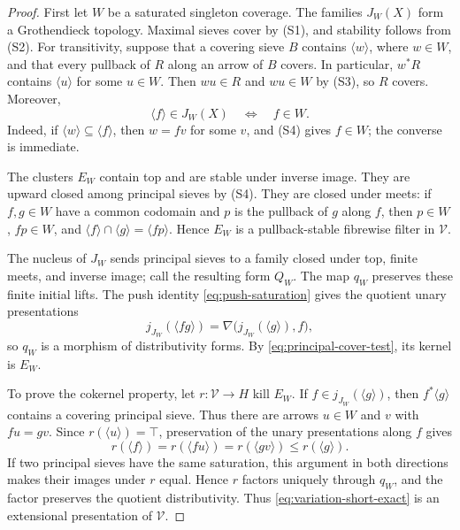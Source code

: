 \documentclass[12pt,oneside,reqno]{amsart}
\theoremstyle{definition}
\theoremstyle{remark}
\newcommand{\Var}{\mathscr V}
\newcommand{\prin}[1]{\langle #1\rangle}
\begin{document}
\begin{proof}
First let \(W\) be a saturated singleton coverage.  The families
\(J_W(X)\) form a Grothendieck topology.  Maximal sieves cover by (S1),
and stability follows from (S2).  For transitivity, suppose that a
covering sieve \(B\) contains \(\prin w\), where \(w\in W\), and that
every pullback of \(R\) along an arrow of \(B\) covers.  In particular,
\(w^*R\) contains \(\prin u\) for some \(u\in W\).  Then \(wu\in R\)
and \(wu\in W\) by (S3), so \(R\) covers.  Moreover,
\begin{equation}\label{eq:principal-cover-test}
                  \prin f\in J_W(X)\quad\Longleftrightarrow\quad f\in W.
\end{equation}
Indeed, if \(\prin w\subseteq\prin f\), then \(w=fv\) for some \(v\),
and (S4) gives \(f\in W\); the converse is immediate.

The clusters \(E_W\) contain top and are stable under inverse image.
They are upward closed among principal sieves by (S4).  They are closed
under meets: if \(f,g\in W\) have a common codomain and \(p\) is the
pullback of \(g\) along \(f\), then \(p\in W\), \(fp\in W\), and
\(\prin f\cap\prin g=\prin{fp}\).  Hence \(E_W\) is a
pullback-stable fibrewise filter in \(\Var\).

The nucleus of \(J_W\) sends principal sieves to a family closed under
top, finite meets, and inverse image; call the resulting form \(Q_W\).
The map \(q_W\) preserves these finite initial lifts.  The push identity
\eqref{eq:push-saturation} gives the quotient unary presentations
\[
 j_{J_W}(\prin{fg})
   =\nabla\bigl(j_{J_W}(\prin g),f\bigr),
\]
so \(q_W\) is a morphism of distributivity forms.  By
\eqref{eq:principal-cover-test}, its kernel is \(E_W\).

To prove the cokernel property, let \(r:\Var\to H\) kill \(E_W\).
If \(f\in j_{J_W}(\prin g)\), then \(f^*\prin g\) contains a covering
principal sieve.  Thus there are arrows \(u\in W\) and \(v\) with
\(fu=gv\).  Since \(r(\prin u)=\top\), preservation of the unary
presentations along \(f\) gives
\[
 r(\prin f)=r(\prin{fu})=r(\prin{gv})\leqslant r(\prin g).
\]
If two principal sieves have the same saturation, this argument in both
directions makes their images under \(r\) equal.  Hence \(r\) factors
uniquely through \(q_W\), and the factor preserves the quotient
distributivity.  Thus \eqref{eq:variation-short-exact} is an
extensional presentation of \(\Var\).


\end{proof}
\end{document}
